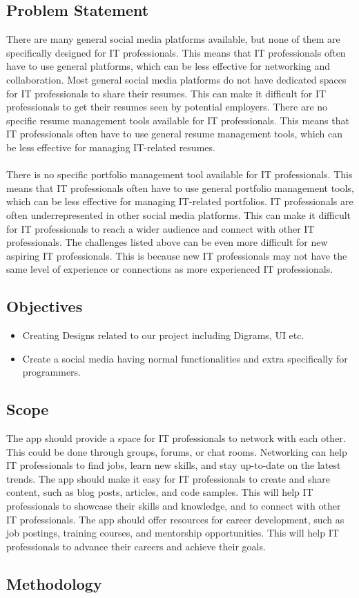 \documentclass[12pt]{article}
\begin{document}
\subsection{Problem Statement}


There are many general social media platforms available, but none of them are specifically designed for IT professionals. This means that IT professionals often have to use general platforms, which can be less effective for networking and collaboration.
Most general social media platforms do not have dedicated spaces for IT professionals to share their resumes. This can make it difficult for IT professionals to get their resumes seen by potential employers.
There are no specific resume management tools available for IT professionals. This means that IT professionals often have to use general resume management tools, which can be less effective for managing IT-related resumes.\\\\
There is no specific portfolio management tool available for IT professionals. This means that IT professionals often have to use general portfolio management tools, which can be less effective for managing IT-related portfolios.
IT professionals are often underrepresented in other social media platforms. This can make it difficult for IT professionals to reach a wider audience and connect with other IT professionals.
The challenges listed above can be even more difficult for new aspiring IT professionals. This is because new IT professionals may not have the same level of experience or connections as more experienced IT professionals.

\subsection{Objectives}
\begin{itemize}
    \item Creating Designs related to our project including Digrams, UI etc.
    \item Create a social media having normal functionalities and extra specifically  for programmers.
\end{itemize}
\subsection{Scope}

The app should provide a space for IT professionals to network with each other. This could be done through groups, forums, or chat rooms. Networking can help IT professionals to find jobs, learn new skills, and stay up-to-date on the latest trends.
The app should make it easy for IT professionals to create and share content, such as blog posts, articles, and code samples. This will help IT professionals to showcase their skills and knowledge, and to connect with other IT professionals.
The app should offer resources for career development, such as job postings, training courses, and mentorship opportunities. This will help IT professionals to advance their careers and achieve their goals.

\subsection{Methodology}
\end{document}

